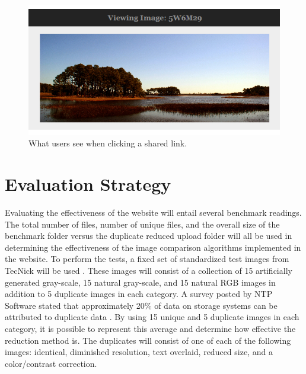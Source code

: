 \documentclass[11pt]{article}
\begin{document}
\begin{figure}[htbp]
\centering
\includegraphics[width=5in]{viewimage}
\caption{What users see when clicking a shared link.}
\label{viewimage}
\end{figure}

\vspace*{-.2in}
\section{Evaluation Strategy}
\label{sec:evaluate}
\vspace*{-.1in}


Evaluating the effectiveness of the website will entail several benchmark readings. The total number of files, number of unique files, and the overall size of the benchmark folder versus the duplicate reduced upload folder will all be used in determining the effectiveness of the image comparison algorithms implemented in the website. To perform the tests, a fixed set of standardized test images from TecNick will be used \cite{tecnick:testimage}. These images will consist of a collection of 15 artificially generated gray-scale, 15 natural gray-scale, and 15 natural RGB images in addition to 5 duplicate images in each category. A survey posted by NTP Software stated that approximately 20\% of data on storage systems can be attributed to duplicate data \cite{ntps:staledata}. By using 15 unique and 5 duplicate images in each category, it is possible to represent this average and determine how effective the reduction method is. The duplicates will consist of one of each of the following images: identical, diminished resolution, text overlaid, reduced size, and a color/contrast correction.
\end{document}
